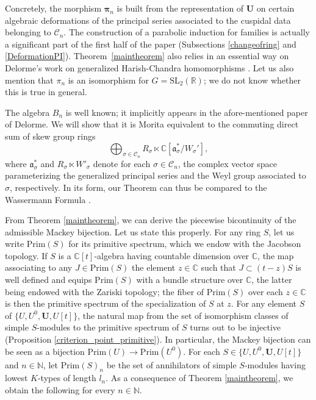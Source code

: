 \documentclass{amsart}
\theoremstyle{definition}
\begin{document}
Concretely, the morphism $\bm{\pi}_n$ is built from the representation of $\bm{U}$ on certain algebraic deformations of the principal series associated to the cuspidal data belonging to $\mathcal{C}_n$. The construction of a parabolic induction for families is actually a significant part of the first half of the paper (Subsections \ref{changeofring} and \ref{DeformationPI}). Theorem~\ref{maintheorem} also relies in an essential way on Delorme's work on generalized Harish-Chandra homomorphisms \cites{Delorme84}. Let us also mention that $\pi_n$ is an isomorphism for $G = \mathrm{SL}_2(\mathbb{R})$; we do not know whether this is true in general.

The algebra $B_n$ is well known; it implicitly appears in the afore-mentioned paper of Delorme. We will show that it is Morita equivalent to the commuting direct sum of skew group rings
    \[\bigoplus_{\sigma \in \mathcal{C}_n} R_\sigma \ltimes\mathbb{C}[\mathfrak{a}^*_\sigma /W_\sigma'],\]
where $\mathfrak{a}_\sigma^*$ and $R_\sigma \ltimes W'_\sigma$ denote for each $\sigma \in \mathcal{C}_n$, the complex vector space parameterizing the generalized principal series and the Weyl group associated to $\sigma$, respectively. In its form, our Theorem can thus be compared to the Wassermann Formula \cite{Wassermann}.
    
From Theorem \ref{maintheorem}, we can derive the piecewise bicontinuity of the admissible Mackey bijection. Let us state this properly. For any ring $S$, let us write $\mathrm{Prim}(S)$ for its primitive spectrum, which we endow with the Jacobson topology. If $S$ is a $\mathbb{C}[t]$-algebra having countable dimension over $\mathbb{C}$, the map associating to any $J \in \mathrm{Prim}(S)$ the element $z\in \mathbb{C}$ such that $J\subset (t-z)S$ is well defined and equips $\mathrm{Prim}(S)$ with a bundle structure over $\mathbb{C}$, the latter being endowed with the Zariski topology; the fiber of $\mathrm{Prim}(S)$ over each $z \in \mathbb{C}$ is then the primitive spectrum of the specialization of $S$ at $z$. For any element $S$ of $\{U,U^0, \bm{U}, U[t]\}$, the natural map from the set of isomorphism classes of simple $S$-modules to the primitive spectrum of $S$ turns out to be injective (Proposition \ref{criterion_point_primitive}). In particular, the Mackey bijection can be seen as a bijection $\mathrm{Prim}(U) \to \mathrm{Prim}(U^0)$. For each $S \in \{U,U^0, \bm{U},U[t]\}$ and $n \in \mathbb{N}$, let $\mathrm{Prim}(S)_n$ be the set of annihilators of simple $S$-modules having lowest $K$-types of length $l_n$. As a consequence of Theorem \ref{maintheorem}, we obtain the following for every $n \in \mathbb{N}$.
\end{document}
